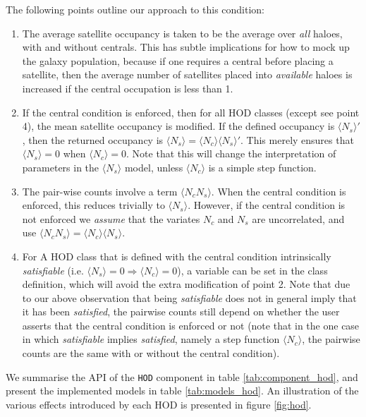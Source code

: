 \documentclass[5p]{elsarticle}
\newcommand{\Nc}{\langle N_c \rangle}
\newcommand{\Ns}{\langle N_s \rangle}
\begin{document}
The following points outline our approach to this condition:
\begin{enumerate}
    \item The average satellite occupancy is taken to be the average over \textit{all} haloes, with and without centrals. This has subtle implications for how to mock up the galaxy population, because if one requires a central before placing a satellite, then the average number of satellites placed into \textit{available} haloes is increased if the central occupation is less than 1.
    
    \item If the central condition is enforced, then for all HOD classes (except see point 4), the mean satellite occupancy is modified. If the defined occupancy is $\Ns'$, then the returned occupancy is $\Ns = \Nc\Ns'$. This merely ensures that $\Ns=0$ when $\Nc=0$. Note that this will change the interpretation of parameters in the $\Ns$ model, unless $\Nc$ is a simple step function.
    
    \item The pair-wise counts involve a term $\langle N_c N_s\rangle$. When the central condition is enforced, this reduces trivially to $\Ns$. However, if the central condition is not enforced we \textit{assume} that the variates $N_c$ and $N_s$ are uncorrelated, and use $\langle N_c N_s\rangle = \Nc\Ns$.
    
    \item For A HOD class that is defined with the central condition intrinsically \textit{satisfiable} (i.e. $\Ns=0 \Rightarrow \Nc=0$), a variable can be set in the class definition, which will avoid the extra modification of point 2. Note that due to our above observation that being \textit{satisfiable} does not in general imply that it has been \textit{satisfied}, the pairwise counts still depend on whether the user asserts that the central condition is enforced or not (note that in the one case in which \textit{satisfiable} implies \textit{satisfied}, namely a step function $\Nc$, the pairwise counts are the same with or without the central condition).
\end{enumerate}

We summarise the API of the \verb|HOD| component in table \ref{tab:component_hod}, and present the implemented models in table \ref{tab:models_hod}. An illustration of the various effects introduced by each HOD is presented in figure \ref{fig:hod}.
\end{document}
